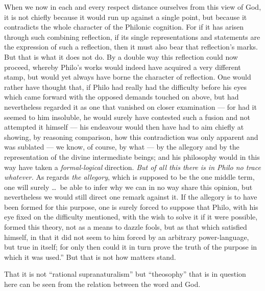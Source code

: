 \documentclass[12pt,a4paper,openany]{book}
\newcommand{\opage}[1]{\marginnote{\footnotesize\textit{[#1]}}}
\begin{document}
When we now in each and every respect distance ourselves from this view of God, it is not chiefly because it would
run up against a single point, but because it contradicts the whole character of the Philonic cognition. For if it has
arisen through such combining reflection, if its single representations and statements are the expression of such a
reflection, then it must also bear that reflection's marks. But that is what it does not do. By a double way this
reflection could now proceed, whereby Philo's works would indeed have acquired a very different stamp, but would yet
always have borne the character of reflection. One would rather have thought that, if Philo had really had the
difficulty before his eyes which came forward with the opposed demands touched on above, but had nevertheless regarded
it as one that vanished on closer examination --- for had it seemed to him insoluble, he would surely have contested
such a fusion and not attempted it himself --- his endeavour would then have had to aim chiefly at showing, by
reasoning comparison, how this contradiction was only apparent and was sublated --- we know, of course, by what ---
by the allegory and by the representation of the divine intermediate beings; and his philosophy would in this way
have taken a \emph{formal-logical} direction. \emph{But of all this there is in Philo no trace whatever.} As regards
\emph{the allegory}, which is supposed to be the one middle term, one will surely \ldots\ be able to infer why we can
in no way share this opinion, but nevertheless we would still direct one remark against it. If the allegory is to
have been formed for this purpose, one is surely forced to suppose that Philo, with his eye fixed on the difficulty
mentioned, with the wish to solve it if it were possible, formed this theory, not as a means to
\opage{89}dazzle fools, but as that which satisfied himself, in that it did not seem to him forced by an arbitrary
power-language, but true in itself; for only then could it in turn prove the truth of the purpose in which it was
used.'' But that is not how matters stand.

That it is not ``rational supranaturalism'' but ``theosophy'' that is in question here can be seen from the
relation between the word and God.
\end{document}
